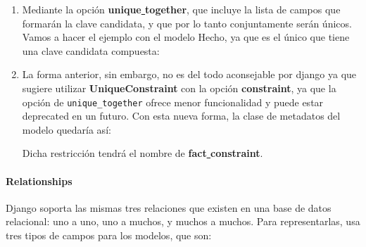     \begin{enumerate}
        \item Mediante la opción \textbf{unique\underline{ }together}, que incluye la lista
        de campos que formarán la clave candidata, y que por lo tanto conjuntamente serán
        únicos. Vamos a hacer el ejemplo con el modelo Hecho, ya que es el único que tiene
        una clave candidata compuesta:
        

        \item La forma anterior, sin embargo, no es del todo aconsejable por django ya
        que sugiere utilizar \textbf{UniqueConstraint} con la opción \textbf{constraint},
        ya que la opción de \verb|unique_together| ofrece menor funcionalidad y puede
        estar deprecated en un futuro. Con esta nueva forma, la clase de metadatos
        del modelo quedaría así:
        

    Dicha restricción tendrá el nombre de \textbf{fact\underline{ }constraint}.
    \end{enumerate}

    \paragraph{Relationships} \underline{}
    \newline Django soporta las mismas tres relaciones que existen en una base de datos relacional:
    uno a uno, uno a muchos, y muchos a muchos. Para representarlas, usa tres tipos de campos
    para los modelos, que son:

